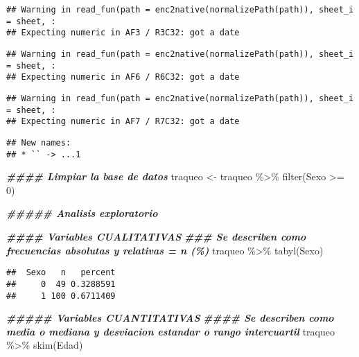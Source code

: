 \documentclass[
]{article}
\newenvironment{Shaded}{\begin{snugshade}}{\end{snugshade}}
\newcommand{\DecValTok}[1]{\textcolor[rgb]{0.00,0.00,0.81}{#1}}
\newcommand{\DocumentationTok}[1]{\textcolor[rgb]{0.56,0.35,0.01}{\textbf{\textit{#1}}}}
\newcommand{\FunctionTok}[1]{\textcolor[rgb]{0.00,0.00,0.00}{#1}}
\newcommand{\NormalTok}[1]{#1}
\newcommand{\OtherTok}[1]{\textcolor[rgb]{0.56,0.35,0.01}{#1}}
\newcommand{\SpecialCharTok}[1]{\textcolor[rgb]{0.00,0.00,0.00}{#1}}
\begin{document}
\begin{verbatim}
## Warning in read_fun(path = enc2native(normalizePath(path)), sheet_i = sheet, :
## Expecting numeric in AF3 / R3C32: got a date
\end{verbatim}

\begin{verbatim}
## Warning in read_fun(path = enc2native(normalizePath(path)), sheet_i = sheet, :
## Expecting numeric in AF6 / R6C32: got a date
\end{verbatim}

\begin{verbatim}
## Warning in read_fun(path = enc2native(normalizePath(path)), sheet_i = sheet, :
## Expecting numeric in AF7 / R7C32: got a date
\end{verbatim}

\begin{verbatim}
## New names:
## * `` -> ...1
\end{verbatim}

\begin{Shaded}
\begin{Highlighting}[]
\DocumentationTok{\#\#\#\# Limpiar la base de datos}
\NormalTok{traqueo }\OtherTok{\textless{}{-}}\NormalTok{ traqueo }\SpecialCharTok{\%\textgreater{}\%}
  \FunctionTok{filter}\NormalTok{(Sexo }\SpecialCharTok{\textgreater{}=} \DecValTok{0}\NormalTok{)}


\DocumentationTok{\#\#\#\#\# Analisis exploratorio}

\DocumentationTok{\#\#\#\# Variables CUALITATIVAS}
\DocumentationTok{\#\#\# Se describen como frecuencias absolutas y relativas = n (\%)}
\NormalTok{traqueo }\SpecialCharTok{\%\textgreater{}\%}
  \FunctionTok{tabyl}\NormalTok{(Sexo)}
\end{Highlighting}
\end{Shaded}

\begin{verbatim}
##  Sexo   n   percent
##     0  49 0.3288591
##     1 100 0.6711409
\end{verbatim}

\begin{Shaded}
\begin{Highlighting}[]
\DocumentationTok{\#\#\#\#\# Variables CUANTITATIVAS}
\DocumentationTok{\#\#\#\# Se describen como media o mediana y desviacion estandar o rango intercuartil }
\NormalTok{traqueo }\SpecialCharTok{\%\textgreater{}\%}
  \FunctionTok{skim}\NormalTok{(Edad)}
\end{Highlighting}
\end{Shaded}
\end{document}
